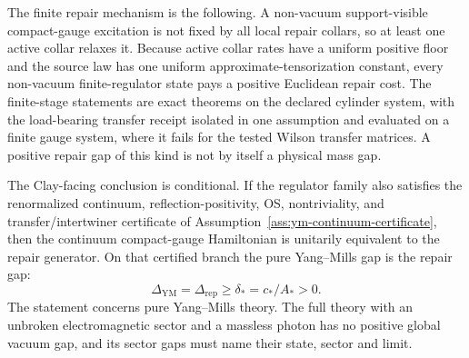 \documentclass[11pt]{article}
\numberwithin{equation}{section}
\theoremstyle{remark}
\newcommand{\YM}{\mathrm{YM}}
\begin{document}
The finite repair mechanism is the following. A non-vacuum support-visible
compact-gauge excitation is not fixed by all local repair collars, so at
least one active collar relaxes it. Because active collar rates have a
uniform positive floor and the source law has one uniform
approximate-tensorization constant, every non-vacuum finite-regulator state
pays a positive Euclidean repair cost. The finite-stage statements are exact
theorems on the declared cylinder system, with the load-bearing transfer
receipt isolated in one assumption and evaluated on a finite gauge system,
where it fails for the tested Wilson transfer matrices. A positive repair
gap of this kind is not by itself a physical mass gap.

The Clay-facing conclusion is conditional. If the regulator family also satisfies the
renormalized continuum, reflection-positivity, OS, nontriviality, and transfer/intertwiner
certificate of Assumption~\ref{ass:ym-continuum-certificate}, then the continuum compact-gauge
Hamiltonian is unitarily equivalent to the repair generator. On that certified branch the
pure Yang--Mills gap is the repair gap:
\[
\boxed{
\Delta_{\YM}=\Delta_{\mathrm{rep}}\ge \delta_*=c_*/A_*>0.
}
\]
The statement concerns pure Yang--Mills theory. The full theory with an
unbroken electromagnetic sector and a massless photon has no positive global
vacuum gap, and its sector gaps must name their state, sector and limit.
\end{document}
